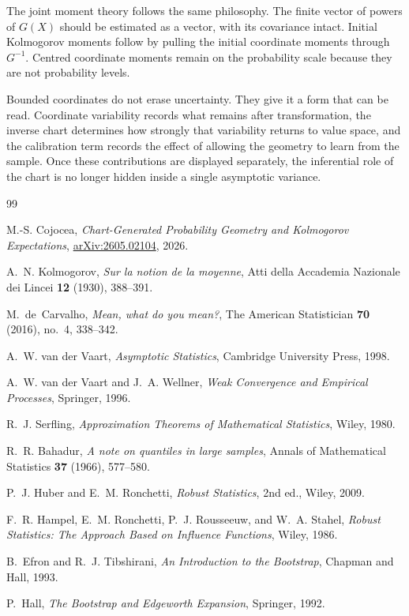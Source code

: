\documentclass[11pt,a4paper]{article}
\theoremstyle{definition}
\begin{document}
The joint moment theory follows the same philosophy. The finite vector of powers of $G(X)$ should be estimated as a vector, with its covariance intact. Initial Kolmogorov moments follow by pulling the initial coordinate moments through $G^{-1}$. Centred coordinate moments remain on the probability scale because they are not probability levels.

Bounded coordinates do not erase uncertainty. They give it a form that can be read. Coordinate variability records what remains after transformation, the inverse chart determines how strongly that variability returns to value space, and the calibration term records the effect of allowing the geometry to learn from the sample. Once these contributions are displayed separately, the inferential role of the chart is no longer hidden inside a single asymptotic variance.

\begin{thebibliography}{99}

M.-S. Cojocea,
\emph{Chart-Generated Probability Geometry and Kolmogorov Expectations},
\href{https://arxiv.org/pdf/2605.02104}{arXiv:2605.02104}, 2026.

A.~N. Kolmogorov,
\emph{Sur la notion de la moyenne},
Atti della Accademia Nazionale dei Lincei \textbf{12} (1930), 388--391.

M.~de~Carvalho,
\emph{Mean, what do you mean?},
The American Statistician \textbf{70} (2016), no.~4, 338--342.

A.~W. van der Vaart,
\emph{Asymptotic Statistics},
Cambridge University Press, 1998.

A.~W. van der Vaart and J.~A. Wellner,
\emph{Weak Convergence and Empirical Processes},
Springer, 1996.

R.~J. Serfling,
\emph{Approximation Theorems of Mathematical Statistics},
Wiley, 1980.

R.~R. Bahadur,
\emph{A note on quantiles in large samples},
Annals of Mathematical Statistics \textbf{37} (1966), 577--580.

P.~J. Huber and E.~M. Ronchetti,
\emph{Robust Statistics}, 2nd ed.,
Wiley, 2009.

F.~R. Hampel, E.~M. Ronchetti, P.~J. Rousseeuw, and W.~A. Stahel,
\emph{Robust Statistics: The Approach Based on Influence Functions},
Wiley, 1986.

B.~Efron and R.~J. Tibshirani,
\emph{An Introduction to the Bootstrap},
Chapman and Hall, 1993.

P.~Hall,
\emph{The Bootstrap and Edgeworth Expansion},
Springer, 1992.

\end{thebibliography}
\end{document}
